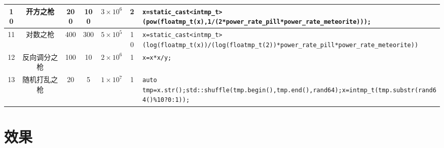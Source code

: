 \documentclass[UTF8,fontset=none,linespread=1.2]{ctexart}
\begin{document}
\begin{center}
\begin{longtable}{|c|c|c|c|c|c|>{\centering\arraybackslash}m{10cm}|}
10&开方之枪&200&100&$3\times10^6$&2&\lstinline|x=static_cast<intmp_t>(pow(floatmp_t(x),1/(2*power_rate_pill*power_rate_meteorite)));|\\\hline
11&对数之枪&400&300&$5\times10^5$&10&\lstinline|x=static_cast<intmp_t>(log(floatmp_t(x))/(log(floatmp_t(2))*power_rate_pill*power_rate_meteorite))|\\\hline
12&反向调分之枪&100&10&$2\times10^6$&1&\lstinline|x=x*x/y;|\\\hline
13&随机打乱之枪&20&5&$1\times10^7$&1&\lstinline|auto tmp=x.str();std::shuffle(tmp.begin(),tmp.end(),rand64);x=intmp_t(tmp.substr(rand64()%10?0:1));|\\\hline
\end{longtable}
\end{center}
\section{效果}
\end{document}
